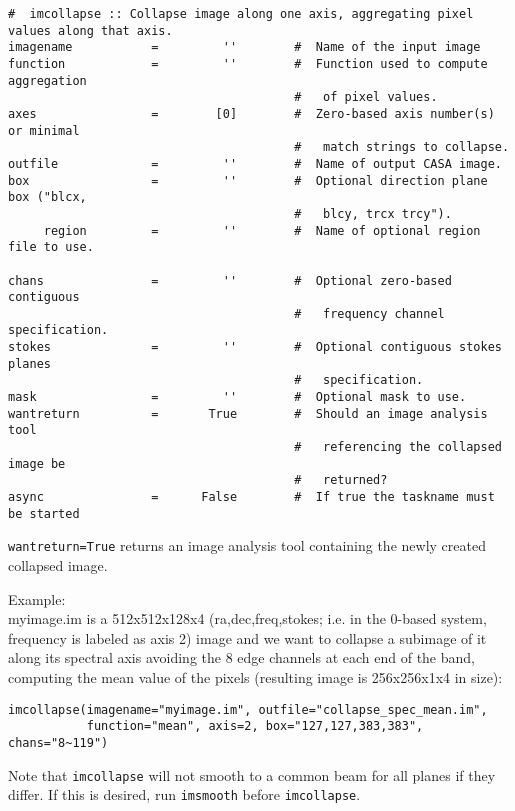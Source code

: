 \small
\begin{verbatim}
#  imcollapse :: Collapse image along one axis, aggregating pixel values along that axis.
imagename           =         ''        #  Name of the input image
function            =         ''        #  Function used to compute aggregation
                                        #   of pixel values.
axes                =        [0]        #  Zero-based axis number(s) or minimal
                                        #   match strings to collapse.
outfile             =         ''        #  Name of output CASA image.
box                 =         ''        #  Optional direction plane box ("blcx,
                                        #   blcy, trcx trcy").
     region         =         ''        #  Name of optional region file to use.

chans               =         ''        #  Optional zero-based contiguous
                                        #   frequency channel specification.
stokes              =         ''        #  Optional contiguous stokes planes
                                        #   specification.
mask                =         ''        #  Optional mask to use.
wantreturn          =       True        #  Should an image analysis tool
                                        #   referencing the collapsed image be
                                        #   returned?
async               =      False        #  If true the taskname must be started
\end{verbatim}
\normalsize

{\tt wantreturn=True} returns an image analysis tool containing the
newly created collapsed image.

Example:\\

myimage.im is a 512x512x128x4 (ra,dec,freq,stokes; i.e. in the 0-based
system, frequency is labeled as axis 2) image and we want to
collapse a subimage of it along its spectral axis avoiding the 8 edge
 channels at each end of the band, computing the mean value of the
pixels (resulting image is 256x256x1x4 in size):

\small
\begin{verbatim}
imcollapse(imagename="myimage.im", outfile="collapse_spec_mean.im",
           function="mean", axis=2, box="127,127,383,383", chans="8~119")
\end{verbatim}
\normalsize

Note that {\tt imcollapse} will not smooth to a common beam for all
planes if they differ. If this is desired, run {\tt imsmooth} before
{\tt imcollapse}.


